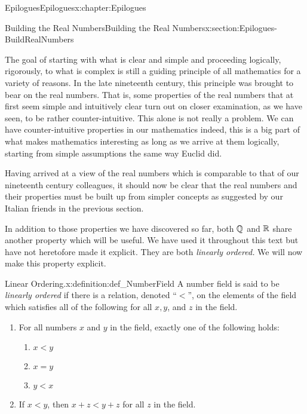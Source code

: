 \begin{chapterptx}{Epilogues}{}{Epilogues}{}{}{x:chapter:Epilogues}
\begin{sectionptx}{Building the Real Numbers}{}{Building the Real Numbers}{}{}{x:section:Epilogues-BuildRealNumbers}
\begin{introduction}{}
			\par
			The goal of starting with what is clear and simple and proceeding logically, rigorously, to what is complex is still a guiding principle of all mathematics for a variety of reasons. In the late nineteenth century, this principle was brought to bear on the real numbers. That is, some properties of the real numbers that at first seem simple and intuitively clear turn out on closer examination, as we have seen, to be rather counter-intuitive. This alone is not really a problem. We can have counter-intuitive properties in our mathematics \textemdash{} indeed, this is a big part of what makes mathematics interesting \textemdash{} as long as we arrive at them logically, starting from simple assumptions the same way Euclid did.%
			\par
			Having arrived at a view of the real numbers which is comparable to that of our nineteenth century colleagues, it should now be clear that the real numbers and their properties must be built up from simpler concepts as suggested by our Italian friends in the previous section.%
			\par
			In addition to those properties we have discovered so far, both \(\mathbb {Q}\) and \(\mathbb {R}\) share another property which will be useful. We have used it throughout this text but have not heretofore made it explicit. They are both \emph{linearly ordered.} We will now make this property explicit.%
			\begin{definition}{Linear Ordering.}{x:definition:def_NumberField}%
				A number field is said to be \emph{linearly ordered} if there is a relation, denoted ``\(\lt \)'', on the elements of the field which satisfies all of the following for all \(x, y\), and \(z\) in the field.%
				\par
				\begin{enumerate}
					\item{}For all numbers \(x\) and \(y\) in the field, exactly one of the following holds:%
					\par
					\begin{enumerate}
						\item{}\(\displaystyle x\lt y\)%
						\item{}\(\displaystyle x=y\)%
						\item{}\(\displaystyle y\lt x\)%
					\end{enumerate}
					\item{}If \(x\lt y\), then \(x+z\lt y+z\) for all \(z\) in the field.%

\end{enumerate}
\end{definition}
\end{introduction}
\end{sectionptx}
\end{chapterptx}
